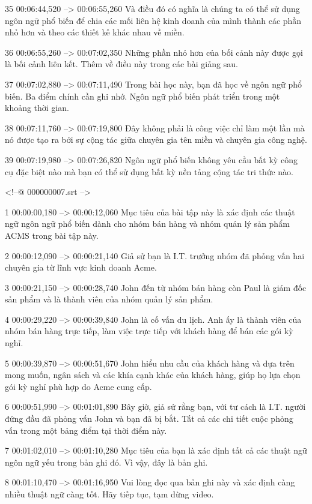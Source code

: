 35
00:06:44,520 --> 00:06:55,260
Và điều đó có nghĩa là chúng ta có thể sử dụng ngôn ngữ phổ biến để chia các mối liên hệ kinh doanh của mình thành các phần nhỏ hơn và theo các thiết kế khác nhau về miền.

36
00:06:55,260 --> 00:07:02,350
Những phần nhỏ hơn của bối cảnh này được gọi là bối cảnh liên kết.  Thêm về điều này trong các bài giảng sau.

37
00:07:02,880 --> 00:07:11,490
Trong bài học này, bạn đã học về ngôn ngữ phổ biến.  Ba điểm chính cần ghi nhớ.  Ngôn ngữ phổ biến phát triển trong một khoảng thời gian.

38
00:07:11,760 --> 00:07:19,800
Đây không phải là công việc chỉ làm một lần mà nó được tạo ra bởi sự cộng tác giữa chuyên gia tên miền và chuyên gia công nghệ.

39
00:07:19,980 --> 00:07:26,820
Ngôn ngữ phổ biến không yêu cầu bất kỳ công cụ đặc biệt nào mà bạn có thể sử dụng bất kỳ nền tảng cộng tác tri thức nào.

<!--@ 000000007.srt -->

1
00:00:00,180 --> 00:00:12,060
Mục tiêu của bài tập này là xác định các thuật ngữ ngôn ngữ phổ biến dành cho nhóm bán hàng và nhóm quản lý sản phẩm ACMS trong bài tập này.

2
00:00:12,090 --> 00:00:21,140
Giả sử bạn là I.T.  trưởng nhóm đã phỏng vấn hai chuyên gia từ lĩnh vực kinh doanh Acme.

3
00:00:21,150 --> 00:00:28,740
John đến từ nhóm bán hàng còn Paul là giám đốc sản phẩm và là thành viên của nhóm quản lý sản phẩm.

4
00:00:29,220 --> 00:00:39,840
John là cố vấn du lịch.  Anh ấy là thành viên của nhóm bán hàng trực tiếp, làm việc trực tiếp với khách hàng để bán các gói kỳ nghỉ.

5
00:00:39,870 --> 00:00:51,670
John hiểu nhu cầu của khách hàng và dựa trên mong muốn, ngân sách và các khía cạnh khác của khách hàng, giúp họ lựa chọn gói kỳ nghỉ phù hợp do Acme cung cấp.

6
00:00:51,990 --> 00:01:01,890
Bây giờ, giả sử rằng bạn, với tư cách là I.T.  người đứng đầu đã phỏng vấn John và bạn đã bị bắt.  Tất cả các chi tiết cuộc phỏng vấn trong một bảng điểm tại thời điểm này.

7
00:01:02,010 --> 00:01:10,280
Mục tiêu của bạn là xác định tất cả các thuật ngữ ngôn ngữ yếu trong bản ghi đó.  Vì vậy, đây là bản ghi.

8
00:01:10,470 --> 00:01:16,950
Vui lòng đọc qua bản ghi này và xác định càng nhiều thuật ngữ càng tốt.  Hãy tiếp tục, tạm dừng video.


